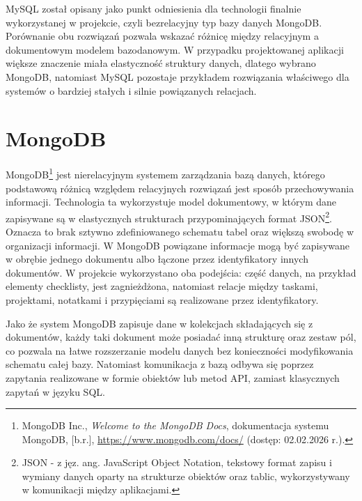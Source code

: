 \documentclass[12pt,a4paper,twoside]{report}
\newcommand{\FirstParagraph}{\noindent\ignorespaces}
\begin{document}
MySQL został opisany jako punkt odniesienia dla technologii finalnie wykorzystanej w projekcie, czyli bezrelacyjny typ bazy danych MongoDB. Porównanie obu rozwiązań pozwala wskazać różnicę między relacyjnym a dokumentowym modelem bazodanowym. W przypadku projektowanej aplikacji większe znaczenie miała elastyczność struktury danych, dlatego wybrano MongoDB, natomiast MySQL pozostaje przykładem rozwiązania właściwego dla systemów o bardziej stałych i silnie powiązanych relacjach.

\section{MongoDB}

\FirstParagraph MongoDB\footnote{MongoDB Inc., \emph{Welcome to the MongoDB Docs}, dokumentacja systemu MongoDB, [b.r.], \url{https://www.mongodb.com/docs/} (dostęp: 02.02.2026 r.).} jest nierelacyjnym systemem zarządzania bazą danych, którego podstawową różnicą względem relacyjnych rozwiązań jest sposób przechowywania informacji. Technologia ta wykorzystuje model dokumentowy, w którym dane zapisywane są w elastycznych strukturach przypominających format JSON\footnote{JSON - z jęz. ang. JavaScript Object Notation, tekstowy format zapisu i wymiany danych oparty na strukturze obiektów oraz tablic, wykorzystywany w komunikacji między aplikacjami.}. Oznacza to brak sztywno zdefiniowanego schematu tabel oraz większą swobodę w organizacji informacji. W MongoDB powiązane informacje mogą być zapisywane w obrębie jednego dokumentu albo łączone przez identyfikatory innych dokumentów. W projekcie wykorzystano oba podejścia: część danych, na przykład elementy checklisty, jest zagnieżdżona, natomiast relacje między taskami, projektami, notatkami i przypięciami są realizowane przez identyfikatory.

Jako że system MongoDB zapisuje dane w kolekcjach składających się z dokumentów, każdy taki dokument może posiadać inną strukturę oraz zestaw pól, co pozwala na łatwe rozszerzanie modelu danych bez konieczności modyfikowania schematu całej bazy. Natomiast komunikacja z bazą odbywa się poprzez zapytania realizowane w formie obiektów lub metod API, zamiast klasycznych zapytań w języku SQL.
\end{document}
